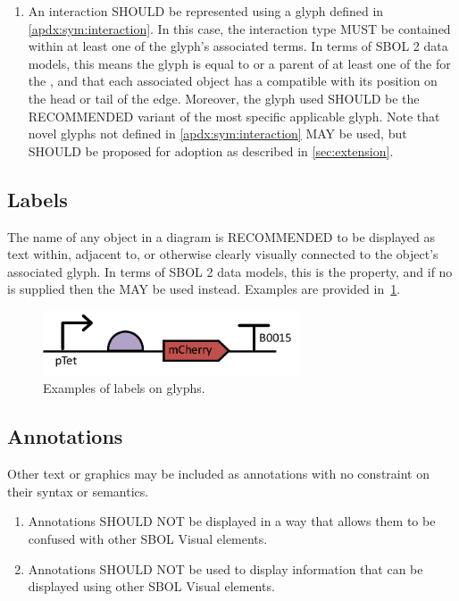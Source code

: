 \begin{enumerate}
\item An interaction SHOULD be represented using a glyph defined in \ref{apdx:sym:interaction}.  In this case, the interaction type MUST be contained within at least one of the glyph's associated terms.
In terms of SBOL 2 data models, this means the glyph is equal to or a parent of at least one of the  for the , and that each associated  object has a  compatible with its position on the head or tail of the edge.
	Moreover, the glyph used SHOULD be the RECOMMENDED variant of the most specific applicable glyph.  Note that novel glyphs not defined in \ref{apdx:sym:interaction} MAY be used, but SHOULD be proposed for adoption as described in \ref{sec:extension}.
\end{enumerate}


\subsection{Labels}
The name of any object in a diagram is RECOMMENDED to be displayed as text within, adjacent to, or otherwise clearly visually connected to the object's associated glyph.  In terms of SBOL 2 data models, this is the  property, and if no  is supplied then the  MAY be used instead.
Examples are provided in~\ref{exa:5}.

	\begin{figure}[h!]
	\centering
	\includegraphics[width=3in]{figures/examples/5-labels.pdf}
	\caption{Examples of labels on glyphs.}
	\label{exa:5}
	\end{figure}


\subsection{Annotations}
Other text or graphics may be included as annotations with no constraint on their syntax or semantics.

\begin{enumerate}
\item Annotations SHOULD NOT be displayed in a way that allows them to be confused with other SBOL Visual elements.
\item Annotations SHOULD NOT be used to display information that can be displayed using other SBOL Visual elements.
\end{enumerate}

